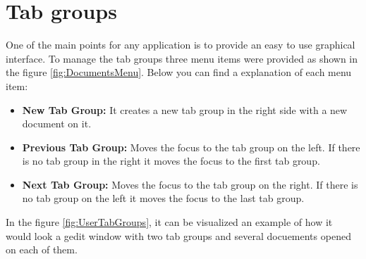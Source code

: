 
\chapter{Tab groups}

One of the main points for any \GNOME application is to provide an easy to use graphical interface. To manage the tab groups three menu items were provided as shown in the figure \ref{fig:DocumentsMenu}. Below you can find a explanation of each menu item:
\begin{itemize}
  \item \textbf{New Tab Group:} It creates a new tab group in the right side with a new document on it.
  \item \textbf{Previous Tab Group:} Moves the focus to the tab group on the left. If there is no tab group in the right it moves the focus to the first tab group.
  \item \textbf{Next Tab Group:} Moves the focus to the tab group on the right. If there is no tab group on the left it moves the focus to the last tab group.
\end{itemize}


In the figure \ref{fig:UserTabGroups}, it can be visualized an example of how it would look a gedit window with two tab groups and several docuements opened on each of them.

